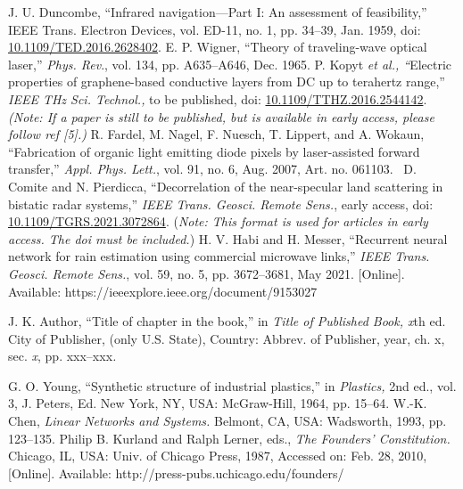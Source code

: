 \documentclass[correspondence]{IEEEtaes}
\begin{document}
\vspace*{-12pt}
\begin{thebibliography}{[34]}
\setcounter{enumiv}{0}
J. U. Duncombe, ``Infrared navigation---Part I: An assessment of feasibility,'' IEEE Trans. Electron Devices, vol. ED-11, no. 1, pp. 34--39, Jan. 1959, doi: \href{https://dx.doi.org/10.1109/TED.2016.2628402}{10.1109/TED.2016.2628402}.
E. P. Wigner, ``Theory of traveling-wave optical laser,'' \emph{Phys. Rev}., vol. 134, pp. A635--A646, Dec. 1965.
P. Kopyt \emph{et al., ``}Electric properties of graphene-based conductive layers from DC up to terahertz range,'' \emph{IEEE THz Sci. Technol.,} to be published, doi: \href{https://dx.doi.org/10.1109/TTHZ.2016.2544142}{10.1109/TTHZ.2016.2544142}. \emph{(Note: If a paper is still to be published, but is available in early access, please follow ref {[}5{]}.)}
R. Fardel, M. Nagel, F. Nuesch, T. Lippert, and A. Wokaun,  ``Fabrication of organic light emitting diode pixels by laser-assisted forward transfer,'' \emph{Appl. Phys. Lett.}, vol. 91, no. 6, Aug. 2007, Art. no. 061103.~
D. Comite and N. Pierdicca, ``Decorrelation of the near-specular land scattering in bistatic radar systems,'' \emph{IEEE Trans. Geosci. Remote Sens.}, early access, doi: \href{https://dx.doi.org/10.1109/TGRS.2021.3072864}{10.1109/TGRS.2021.3072864}. (\emph{Note: This format is used for articles in early access. The doi must be included.})
H. V. Habi and H. Messer, ``Recurrent neural network for rain estimation using commercial microwave links,'' \emph{IEEE Trans. Geosci. Remote Sens.}, vol. 59, no. 5, pp. 3672--3681, May 2021. {[}Online{]}. Available: https://ieeexplore.ieee.org/document/9153027
\end{thebibliography}


\vspace*{-12pt}
\begin{thebibliography}{[34]}
\item[] J. K. Author, ``Title of chapter in the book,'' in \emph{Title of Published Book, x}th ed. City of Publisher, (only U.S. State), Country: Abbrev. of Publisher, year, ch. x, sec. \emph{x}, pp. xxx--xxx\emph{.}
\end{thebibliography}


\vspace*{-12pt}
\begin{thebibliography}{[34]}
\setcounter{enumiv}{6}
G. O. Young, ``Synthetic structure of industrial plastics,'' in \emph{Plastics,} 2nd ed., vol. 3, J. Peters, Ed. New York, NY, USA: McGraw-Hill, 1964, pp. 15--64.
W.-K. Chen, \emph{Linear Networks and Systems.} Belmont, CA, USA: Wadsworth, 1993, pp. 123--135.
Philip B. Kurland and Ralph Lerner, eds., \emph{The Founders' Constitution.} Chicago, IL, USA: Univ. of Chicago Press, 1987, Accessed on: Feb. 28, 2010, {[}Online{]}. Available: http://press-pubs.uchicago.edu/founders/
\end{thebibliography}
\end{document}
